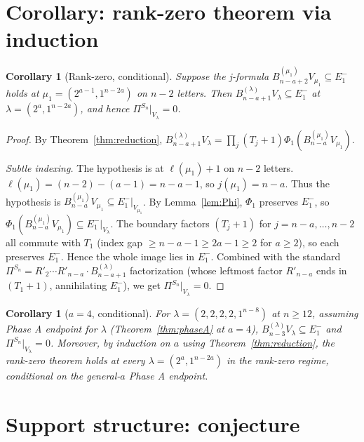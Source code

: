 \documentclass[11pt]{article}
\newtheorem{corollary}[theorem]{Corollary}
\theoremstyle{definition}
\begin{document}
\section{Corollary: rank-zero theorem via induction}\label{sec:corollary}

\begin{corollary}[Rank-zero, conditional]\label{cor:rank-zero}
Suppose the j-formula
$B_{n-a+2}^{(\mu_1)} V_{\mu_1}\subseteq E_1^-$ holds at
$\mu_1=(2^{a-1},1^{n-2a})$ on $n-2$ letters.  Then
$B_{n-a+1}^{(\lambda)} V_\lambda\subseteq E_1^-$ at
$\lambda=(2^a,1^{n-2a})$, and hence
$\Pi^{S_n}|_{V_\lambda}=0$.
\end{corollary}

\begin{proof}
By Theorem~\ref{thm:reduction},
$B_{n-a+1}^{(\lambda)} V_\lambda=
\prod_j(T_j{+}1)\Phi_1(B_{n-a}^{(\mu_1)} V_{\mu_1})$.

\emph{Subtle indexing.}  The hypothesis is at $\ell(\mu_1)+1$ on
$n-2$ letters.  $\ell(\mu_1)=(n-2)-(a-1)=n-a-1$, so
$j(\mu_1)=n-a$.  Thus the hypothesis is
$B_{n-a}^{(\mu_1)} V_{\mu_1}\subseteq E_1^-|_{V_{\mu_1}}$.
By Lemma~\ref{lem:Phi}, $\Phi_1$ preserves $E_1^-$, so
$\Phi_1(B_{n-a}^{(\mu_1)} V_{\mu_1})\subseteq E_1^-|_{V_\lambda}$.
The boundary factors $(T_j{+}1)$ for $j=n-a,\ldots,n-2$ all
commute with $T_1$ (index gap $\ge n-a-1\ge 2a-1\ge 2$ for
$a\ge 2$), so each preserves $E_1^-$.  Hence the whole image
lies in $E_1^-$.  Combined with the standard $\Pi^{S_n}=R'_2\cdots
R'_{n-a}\cdot B_{n-a+1}^{(\lambda)}$ factorization (whose leftmost
factor $R'_{n-a}$ ends in $(T_1{+}1)$, annihilating $E_1^-$), we
get $\Pi^{S_n}|_{V_\lambda}=0$.
\end{proof}

\begin{corollary}[$a=4$, conditional]\label{cor:a4}
For $\lambda=(2,2,2,2,1^{n-8})$ at $n\ge 12$, assuming Phase A
endpoint for $\lambda$ (Theorem~\ref{thm:phaseA} at $a=4$),
$B_{n-3}^{(\lambda)} V_\lambda\subseteq E_1^-$ and
$\Pi^{S_n}|_{V_\lambda}=0$.  Moreover, by induction on $a$ using
Theorem~\ref{thm:reduction}, the rank-zero theorem holds at every
$\lambda=(2^a,1^{n-2a})$ in the rank-zero regime, conditional on
the general-$a$ Phase A endpoint.
\end{corollary}

\section{Support structure: conjecture}
\end{document}
